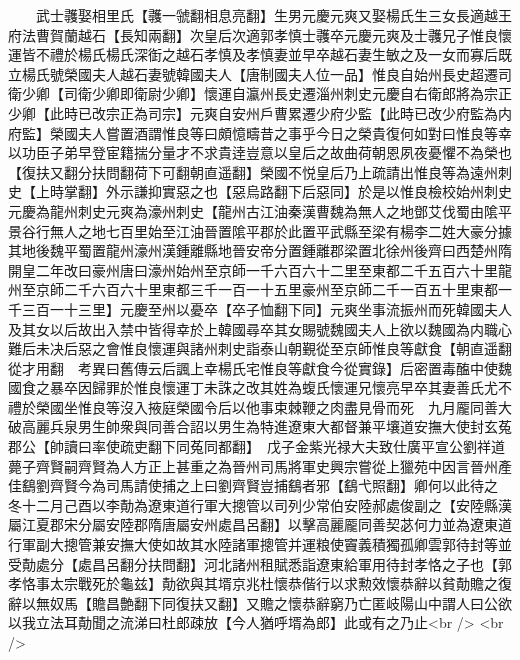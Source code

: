 　　武士彠娶相里氏【彠一虢翻相息亮翻】生男元慶元爽又娶楊氏生三女長適越王府法曹賀蘭越石【長知兩翻】次皇后次適郭孝慎士彠卒元慶元爽及士彠兄子惟良懷運皆不禮於楊氏楊氏深衘之越石孝慎及孝慎妻並早卒越石妻生敏之及一女而寡后既立楊氏號榮國夫人越石妻號韓國夫人【唐制國夫人位一品】惟良自始州長史超遷司衛少卿【司衛少卿即衛尉少卿】懷運自瀛州長史遷淄州刺史元慶自右衛郎將為宗正少卿【此時已改宗正為司宗】元爽自安州戶曹累遷少府少監【此時已改少府監為内府監】榮國夫人嘗置酒謂惟良等曰頗憶疇昔之事乎今日之榮貴復何如對曰惟良等幸以功臣子弟早登宦籍揣分量才不求貴逹豈意以皇后之故曲荷朝恩夙夜憂懼不為榮也【復扶又翻分扶問翻荷下可翻朝直遥翻】榮國不悦皇后乃上疏請出惟良等為遠州刺史【上時掌翻】外示謙抑實惡之也【惡烏路翻下后惡同】於是以惟良檢校始州刺史元慶為龍州刺史元爽為濠州刺史【龍州古江油秦漢曹魏為無人之地鄧艾伐蜀由隂平景谷行無人之地七百里始至江油晉置隂平郡於此置平武縣至梁有楊李二姓大豪分據其地後魏平蜀置龍州濠州漢鍾離縣地晉安帝分置鍾離郡梁置北徐州後齊曰西楚州隋開皇二年改曰豪州唐曰濠州始州至京師一千六百六十二里至東都二千五百六十里龍州至京師二千六百六十里東都三千一百一十五里豪州至京師二千一百五十里東都一千三百一十三里】元慶至州以憂卒【卒子恤翻下同】元爽坐事流振州而死韓國夫人及其女以后故出入禁中皆得幸於上韓國尋卒其女賜號魏國夫人上欲以魏國為内職心難后未决后惡之會惟良懷運與諸州刺史詣泰山朝覲從至京師惟良等獻食【朝直遥翻從才用翻　考異曰舊傳云后諷上幸楊氏宅惟良等獻食今從實錄】后密置毒醢中使魏國食之暴卒因歸罪於惟良懷運丁未誅之改其姓為蝮氏懷運兄懷亮早卒其妻善氏尤不禮於榮國坐惟良等沒入掖庭榮國令后以他事束棘鞭之肉盡見骨而死　九月龎同善大破高麗兵泉男生帥衆與同善合詔以男生為特進遼東大都督兼平壤道安撫大使封玄菟郡公【帥讀曰率使疏吏翻下同菟同都翻】　戊子金紫光禄大夫致仕廣平宣公劉祥道薨子齊賢嗣齊賢為人方正上甚重之為晉州司馬將軍史興宗嘗從上獵苑中因言晉州產佳鷂劉齊賢今為司馬請使捕之上曰劉齊賢豈捕鷂者邪【鷂弋照翻】卿何以此待之　冬十二月己酉以李勣為遼東道行軍大摠管以司列少常伯安陸郝處俊副之【安陸縣漢屬江夏郡宋分屬安陸郡隋唐屬安州處昌呂翻】以擊高麗龎同善契苾何力並為遼東道行軍副大摠管兼安撫大使如故其水陸諸軍摠管并運粮使竇義積獨孤卿雲郭待封等並受勣處分【處昌呂翻分扶問翻】河北諸州租賦悉詣遼東給軍用待封孝恪之子也【郭孝恪事太宗戰死於龜兹】勣欲與其壻京兆杜懷恭偕行以求勲效懷恭辭以貧勣贍之復辭以無奴馬【贍昌艶翻下同復扶又翻】又贍之懷恭辭窮乃亡匿岐陽山中謂人曰公欲以我立法耳勣聞之流涕曰杜郎疎放【今人猶呼壻為郎】此或有之乃止<br />
<br />
